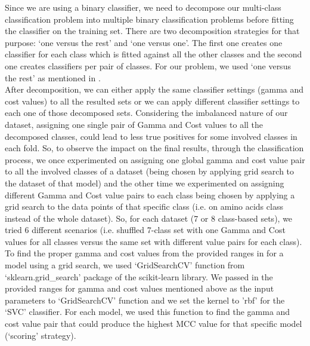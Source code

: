     Since we are using a binary classifier, we need to decompose our multi-class classification problem into 
    multiple binary classification problems before fitting the classifier on the training set. 
    There are two decomposition strategies for that purpose: `one versus the rest' and `one versus one'. 
    The first one creates one classifier for each class which is fitted against all the other classes and the second one creates 
    classifiers per pair of classes. 
    For our problem, we used `one versus the rest' as mentioned in \cite{mishra2014prediction}. \\

    After decomposition, we can either apply the same classifier settings (gamma and cost values) to all the resulted sets 
    or we can apply different classifier settings to each one of those decomposed sets. Considering the imbalanced nature of our dataset, 
    assigning one single pair of Gamma and Cost values to all the decomposed classes, could lead to less true positives 
    for some involved classes in each fold. So, to observe the impact on the final results, through the classification process, 
    we once experimented on assigning one global gamma and cost value pair to all the involved classes of a dataset 
    (being chosen by applying grid search to the dataset of that model) 
    and the other time we experimented on assigning different Gamma and Cost value pairs to each class 
    being chosen by applying a grid search to the data points of that specific class (i.e. on amino acids class instead of the whole dataset). 
    So, for each dataset (7 or 8 class-based sets), we tried 6 different scenarios (i.e. shuffled 7-class set with one Gamma and Cost values 
    for all classes versus the same set with different value pairs for each class).\\        

    To find the proper gamma and cost values from the provided ranges in \cite{mishra2014prediction} for a model using a 
    grid search, we used `GridSearchCV' function from `sklearn.grid\_search' package of the scikit-learn library. We passed in the 
    provided ranges for gamma and cost values mentioned above as the input parameters to `GridSearchCV' function and we set 
    the kernel to 'rbf' for the `SVC' classifier. For each model, we used this function to find the gamma and cost value pair 
    that could produce the highest MCC value for that specific model (`scoring' strategy).

        

